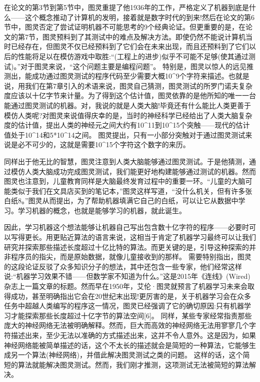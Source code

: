 在论文的第3节到第5节中，图灵重提了他1936年的工作，严格定义了机器到底是什么——这个概念推动了计算机的发明，接着就是数字时代的到来!然后在论文的第6节中，图灵否定了尝试证明机器不可能思考的9个经典论证。但更重要的是，在论文的第7节，图灵预料到了其测试中的难点及解决方法。即使仍然不能说计算机当时已经存在，但图灵不仅已经预料到了它们会在未来出现，而且还预料到了它们以后的性能将足以在模仿游戏中取胜:“(工程上的进步)似乎不可能不足够(使其通过测试)。”对于图灵来说，“这个问题主要是编程问题”。
特别是，图灵以惊人的远见推测出，能成功通过图灵测试的程序代码至少需要大概10^9个字符来描述。也就是说，用我们在第7章引入的术语来说，图灵自己猜测，图灵测试的所罗门诺夫复杂度应该以十亿字节来计量。为了得到这个估计值，图灵依靠的是他所知的唯一一台能通过图灵测试的机器。对，我说的就是人类大脑!毕竟还有什么能比人类更善于模仿人类呢?对图灵来说值得庆幸的是，当时的神经科学已经给出了人类大脑复杂度的估计值，提出人类的神经元之间大约有10^11到10^15个突触——现代的估计值处于10^14和5*10^14之间。
图灵提出，只有一小部分突触对于通过图灵测试来说是必不可少的，这就是需要10^15个字符这个数字的来历。

同样出于他无比的智慧，图灵注意到人类大脑能够通过图灵测试。于是他猜测，通过模仿人类大脑成功完成图灵测试，我们能更好地构建能够通过测试的机器。然而图灵也注意到，儿童教育同样是大脑最终发育过程中的重要一环。“儿童的大脑可能类似于我们在文具店买到的笔记本，”图灵这样写道，“没什么机关，但有许多张白纸8。”图灵从而提出，为了帮助机器填满它自己的白纸，可以让它从数据中学习。学习机器的概念，也就是能够学习的机器，就此诞生。

因此，学习机器这个想法能够让机器自己写出包含数十亿字符的程序——必要时可以写得更长。用更贴近算法的语言来说，这相当于肯定了机器学习最终可以让我们研究并探索那些描述长度超过十亿比特的算法。而更关键的是，引导这种探索的并非程序员的指尖，而是原始数据，就像儿童接收到的那样。
需要特别指出，图灵的这段论证反驳了众多知识分子的想法，其中还包含一些专家，他们经常这样说:“机器学习效果不错——但数学家不知道为什么。”这是2015年《连线》(Wired)杂志上一篇文章的标题。然而早在1950年，艾伦·图灵就预言了机器学习未来会取得成功，甚至明确指出它会在20世纪末出现!更厉害的是，关于机器学习会在众多任务中超越人类编写的程序这一情况，图灵已经强调了它的确切原因:只有机器学习才能探索那些长度超过十亿字节的算法空间[6]。
同样，某些专家经常指责那些庞大的神经网络无法被明确解释。然而，巨大而高效的神经网络无法用寥寥几个字符描述出来，至少无法以准确的方式描述出来，这并不令人意外。这是因为，如果神经网络能被简单描述的话，这个不太长的描述就会是简短的一种算法，它能够生成另一个算法(神经网络)，并借此解决图灵测试之类的问题。
这样的话，这个简短的算法就能解决图灵测试。然而，我们刚才推测，这项测试无法被简短的算法解决。

